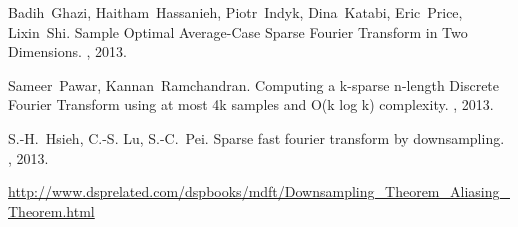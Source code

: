 \documentclass[11pt]{article}
\theoremstyle{case}
\begin{document}



\begin{thebibliography}{42}



Badih~Ghazi, Haitham~Hassanieh, Piotr~Indyk, Dina~Katabi, Eric~Price, Lixin~Shi.
\newblock Sample Optimal Average-Case Sparse Fourier Transform in Two Dimensions.
, 2013.

Sameer~Pawar, Kannan~Ramchandran.
\newblock Computing a k-sparse n-length Discrete Fourier Transform using at most 4k samples and O(k log k) complexity.
, 2013.

S.-H.~Hsieh, C.-S. Lu, S.-C.~Pei.
\newblock Sparse fast fourier transform by downsampling.
, 2013.

\url{http://www.dsprelated.com/dspbooks/mdft/Downsampling_Theorem_Aliasing_Theorem.html}


\end{thebibliography}
\end{document}
